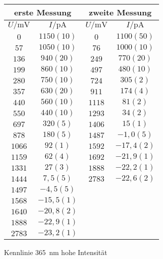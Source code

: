 \begin{figure}[htbp]
   \centering
\caption{Kennlinie \SI{365}{nm} hohe Intensität}
\begin{tabular}{cc||cc}
\hline\multicolumn{2}{c||}{erste Messung} & \multicolumn{2}{c}{zweite Messung}\\

\hline
$U / \unit{\milli\volt}$ & $I / \unit{\pico\ampere}$ & $U / \unit{\milli\volt}$ & $I / \unit{\pico\ampere}$ \\ 
\hline
$0$ & $1150(10)$ & $0$ & $1100(50)$ \\
$57$ & $1050(10)$ & $76$ & $1000(10)$ \\
$136$ & $940(20)$ & $249$ & $770(20)$ \\
$199$ & $860(10)$ & $497$ & $480(10)$ \\
$280$ & $750(10)$ & $724$ & $305(2)$ \\
$357$ & $630(20)$ & $911$ & $174(4)$ \\
$440$ & $560(10)$ & $1118$ & $81(2)$ \\
$550$ & $440(10)$ & $1293$ & $34(2)$ \\
$697$ & $320(5)$ & $1406$ & $15(1)$ \\
$878$ & $180(5)$ & $1487$ & $-1,0(5)$ \\
$1066$ & $92(1)$ & $1592$ & $-17,4(2)$ \\
$1159$ & $62(4)$ & $1692$ & $-21,9(1)$ \\
$1331$ & $27(3)$ & $1888$ & $-22,2(1)$ \\
$1444$ & $7,5(5)$ & $2783$ & $-22,6(2)$ \\
$1497$ & $-4,5(5)$ &    &    \\
$1568$ & $-15,5(1)$ &    &    \\
$1640$ & $-20,8(2)$ &    &    \\
$1888$ & $-22,9(1)$ &    &    \\
$2783$ & $-23,2(1)$ &    &    \\
\hline\end{tabular}
\label{kennlinie_365nm_hohe_intensität}
\end{figure}
